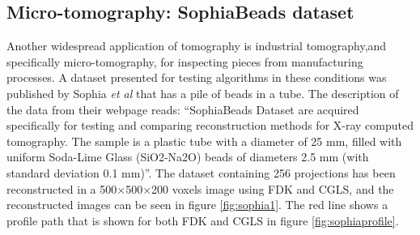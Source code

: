 \subsection{Micro-tomography: SophiaBeads dataset}
Another widespread application of tomography is industrial tomography,and specifically micro-tomography, for inspecting pieces from manufacturing processes. A dataset presented for testing algorithms in these conditions was published by Sophia \textit{et al}\cite{coban_2015_16539}\cite{coban2015sophiabeads} that has a pile of beads in a tube. The description of the data from their webpage\cite{coban_2015_16474} reads: ``SophiaBeads Dataset are acquired specifically for testing and comparing reconstruction methods for X-ray computed tomography. The sample is a plastic tube with a diameter of 25 mm, filled with uniform Soda-Lime Glass (SiO2-Na2O) beads of diameters 2.5 mm (with standard deviation 0.1 mm)''. The dataset containing 256 projections has been reconstructed in a 500$\times$500$\times$200 voxels image using FDK and CGLS, and the reconstructed images can be seen in figure \ref{fig:sophia1}. The red line shows a profile path that is shown for both FDK and CGLS in figure \ref{fig:sophiaprofile}. 

